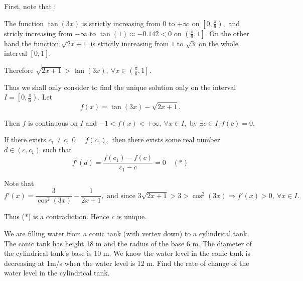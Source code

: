 \documentclass{article}
\begin{document}
\begin{soln}
    First, note that :
    \begin{itemize}[topsep=0pt, partopsep=0pt, itemsep=0pt]
        \ii The function $\tan(3x)$ is strictly increasing from $0$ to $+\infty$ on $\left[ 0, \frac{\pi}{6} \right),$
        and stricly increasing from $-\infty$ to $\tan(1) \approx -0.142 < 0$ on $\left( \frac{\pi}{6}, 1 \right].$
        \ii On the other hand the function $\sqrt{2x + 1}$ is strictly increasing from $1$ to $\sqrt{3}$ on the whole interval $[0,1].$
    \end{itemize}

    Therefore $\sqrt{2x + 1} > \tan(3x),\ \forall x \in \left( \frac{\pi}{6}, 1\right].$

    Thus we shall only consider to find the unique solution only on the interval $I = \left[ 0, \frac{\pi}{6} \right).$
    Let
    \[
        f(x) = \tan(3x) - \sqrt{2x + 1}.
    \]
    
    Then $f$ is continuous on $I$ and $-1 < f(x) < +\infty,\ \forall x \in I,$
    by  $\exists c \in I: f(c) = 0.$

    If there exists $c_1 \ne c,$ $0 = f(c_1),$ then there exists some real number $d \in (c,c_1)$ such that 
    \[
        f'(d) = \frac{f(c_1) - f(c)}{c_1 - c} = 0 \quad (*)
    \]
    
    Note that
    \[
        f'(x) = \dfrac{3}{\cos^2(3x)} - \dfrac{1}{2x+1}, \text{\ and since\ } 3\sqrt{2x + 1} > 3 > \cos^2(3x) \Rightarrow f'(x) > 0,\ \forall x\in I.
    \]

    Thus (*) is a contradiction. Hence $c$ is unique.
\end{soln}

\newpage

\begin{problem*}[4]
    We are filling water from a conic tank (with vertex down) to a cylindrical tank.
    The conic tank has height 18 m and the radius of the base 6 m. The diameter of the cylindrical tank’s base is 10 m.
    We know the water level in the conic tank is decreasing at 1m/s when the water level is 12 m.
    Find the rate of change of the water level in the cylindrical tank.
\end{problem*}
\end{document}
